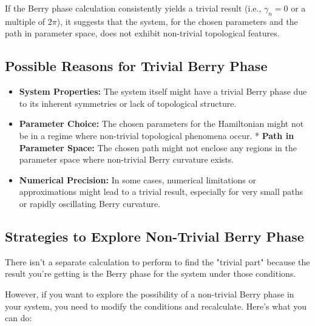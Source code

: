 \documentclass{article}
\begin{document}
If the Berry phase calculation consistently yields a trivial result (i.e., $\gamma_n = 0$ or a multiple of $2\pi$), it suggests that the system, for the chosen parameters and the path in parameter space, does not exhibit non-trivial topological features.

\subsection{Possible Reasons for Trivial Berry Phase}

\begin{itemize}
    \item   \textbf{System Properties:} The system itself might have a trivial Berry phase due to its inherent symmetries or lack of topological structure.
    \item   \textbf{Parameter Choice:} The chosen parameters for the Hamiltonian might not be in a regime where non-trivial topological phenomena occur.
    * \textbf{Path in Parameter Space:} The chosen path might not enclose any regions in the parameter space where non-trivial Berry curvature exists.
    \item   \textbf{Numerical Precision:} In some cases, numerical limitations or approximations might lead to a trivial result, especially for very small paths or rapidly oscillating Berry curvature.
\end{itemize}

\subsection{Strategies to Explore Non-Trivial Berry Phase}

There isn't a separate calculation to perform to find the "trivial part" because the result you're getting is the Berry phase for the system under those conditions.

However, if you want to explore the possibility of a non-trivial Berry phase in your system, you need to modify the conditions and recalculate. Here's what you can do:
\end{document}
